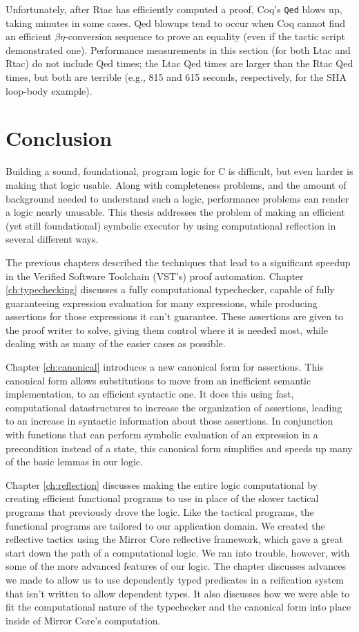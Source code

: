\documentclass{puthesis}
\begin{document}
Unfortunately, after Rtac has efficiently computed a proof, Coq's
\lstinline|Qed| blows up, taking minutes in some cases.  Qed blowups
tend to occur when Coq cannot find an efficient $\beta\eta$-conversion
sequence to prove an equality (even if the tactic script demonstrated
one).  Performance measurements in this section (for both Ltac and
Rtac) do not include Qed times; the Ltac Qed times are larger than the
Rtac Qed times, but both are terrible (e.g., 815 and 615 seconds,
respectively, for the SHA loop-body example).


\chapter{Conclusion}

Building a sound, foundational, program logic for C is difficult, but
even harder is making that logic usable. Along with completeness
problems, and the amount of background needed to understand such a
logic, performance problems can render a logic nearly unusable. This
thesis addresses the problem of making an efficient (yet still
foundational) symbolic executor by using computational reflection in
several different ways.

The previous chapters described the techniques that lead to a
significant speedup in the Verified Software Toolchain (VST's) proof
automation. Chapter \ref{ch:typechecking} discusses a fully
computational typechecker, capable of fully guaranteeing expression
evaluation for many expressions, while producing assertions for those
expressions it can't guarantee. These assertions are given to the
proof writer to solve, giving them control where it is needed most,
while dealing with as many of the easier cases as possible. 

Chapter \ref{ch:canonical} introduces a new canonical form for
assertions. This canonical form allows substitutions to move from an
inefficient semantic implementation, to an efficient syntactic one. It
does this using fast, computational datastructures to increase the
organization of assertions, leading to an increase in syntactic
information about those assertions. In conjunction with functions that
can perform symbolic evaluation of an expression in a precondition
instead of a state, this canonical form simplifies and speeds up many
of the basic lemmas in our logic.

Chapter \ref{ch:reflection} discusses making the entire logic
computational by creating efficient functional programs to use in
place of the slower tactical programs that previously drove the
logic. Like the tactical programs, the functional programs are
tailored to our application domain. We created the reflective tactics
using the Mirror Core reflective framework, which gave a great start
down the path of a computational logic. We ran into trouble, however,
with some of the more advanced features of our logic. The chapter
discusses advances we made to allow us to use dependently typed
predicates in a reification system that isn't written to allow
dependent types. It also discusses how we were able to fit the
computational nature of the typechecker and the canonical form into
place inside of Mirror Core's computation.
\end{document}
